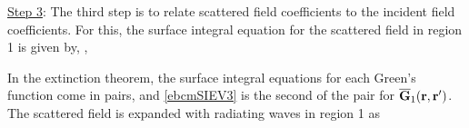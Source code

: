 %
%
%


%
%
%
%
%


\underline{Step 3}: The third step is to relate scattered field coefficients to the incident field coefficients. For this, the surface integral equation for the scattered field in region 1 is given by, \cite{chew1995waves},

In the extinction theorem, the surface integral equations for each Green's function come in pairs, and \eqref{ebcmSIEV3} is the second of the pair for $\overline{\mathbf{G}}_{1}(\mathbf{r},\mathbf{r}')$.  The scattered field is expanded with radiating waves in region 1 as

